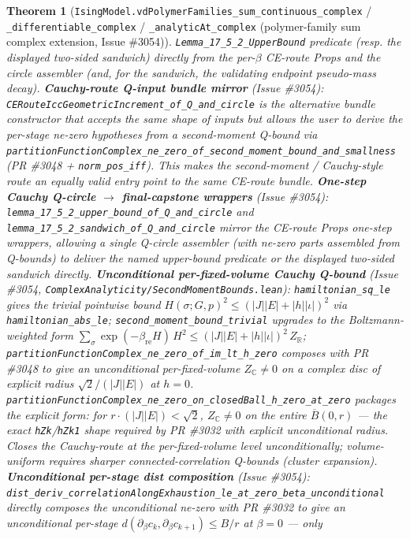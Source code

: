 \documentclass[a4paper,11pt]{article}
\newtheorem{theorem}{Theorem}
\begin{document}
\begin{theorem}[\texttt{IsingModel.vdPolymerFamilies\_sum\_continuous\_complex} /
\texttt{\_differentiable\_complex} / \texttt{\_analyticAt\_complex} (polymer-family sum
complex extension, Issue \#3054)]
\texttt{Lemma\_17\_5\_2\_UpperBound} predicate (resp. the displayed two-sided
sandwich) directly from the per-\(\beta\) CE-route Props and the circle
assembler (and, for the sandwich, the validating endpoint pseudo-mass decay).
\textbf{Cauchy-route Q-input bundle mirror} (Issue \#3054):
\texttt{CERouteIccGeometricIncrement\_of\_Q\_and\_circle} is the alternative
bundle constructor that accepts the same shape of inputs but allows the user
to derive the per-stage ne-zero hypotheses from a second-moment Q-bound via
\texttt{partitionFunctionComplex\_ne\_zero\_of\_second\_moment\_bound\_and\_smallness}
(PR \#3048 + \texttt{norm\_pos\_iff}). This makes the second-moment /
Cauchy-style route an equally valid entry point to the same CE-route bundle.
\textbf{One-step Cauchy Q-circle \(\to\) final-capstone wrappers} (Issue \#3054):
\texttt{lemma\_17\_5\_2\_upper\_bound\_of\_Q\_and\_circle} and
\texttt{lemma\_17\_5\_2\_sandwich\_of\_Q\_and\_circle} mirror the CE-route Props
one-step wrappers, allowing a single Q-circle assembler (with ne-zero parts
assembled from Q-bounds) to deliver the named upper-bound predicate or the
displayed two-sided sandwich directly.
\textbf{Unconditional per-fixed-volume Cauchy Q-bound} (Issue \#3054,
\texttt{ComplexAnalyticity/SecondMomentBounds.lean}):
\texttt{hamiltonian\_sq\_le} gives the trivial pointwise bound
\(H(\sigma;G,p)^2\le(|J||E|+|h||\iota|)^2\) via \texttt{hamiltonian\_abs\_le};
\texttt{second\_moment\_bound\_trivial} upgrades to the Boltzmann-weighted form
\(\sum_\sigma\exp(-\beta_{\mathrm{re}}H)\,H^2\le(|J||E|+|h||\iota|)^2\,Z_{\mathbb{R}}\);
\texttt{partitionFunctionComplex\_ne\_zero\_of\_im\_lt\_h\_zero} composes with
PR \#3048 to give an unconditional per-fixed-volume \(Z_{\mathbb{C}}\ne0\) on a
complex disc of explicit radius \(\sqrt{2}/(|J||E|)\) at \(h=0\).
\texttt{partitionFunctionComplex\_ne\_zero\_on\_closedBall\_h\_zero\_at\_zero}
packages the explicit form: for
\(r\cdot(|J||E|)<\sqrt{2}\), \(Z_{\mathbb{C}}\ne0\) on the entire
\(\overline{B}(0,r)\) — the exact \texttt{hZk}/\texttt{hZk1} shape required by
PR \#3032 with explicit unconditional radius. Closes the Cauchy-route at the
per-fixed-volume level unconditionally; volume-uniform requires sharper
connected-correlation Q-bounds (cluster expansion).
\textbf{Unconditional per-stage dist composition} (Issue \#3054):
\texttt{dist\_deriv\_correlationAlongExhaustion\_le\_at\_zero\_beta\_unconditional}
directly composes the unconditional ne-zero with PR \#3032 to give an
unconditional per-stage
\(d(\partial_\beta c_k,\partial_\beta c_{k+1})\le B/r\) at \(\beta=0\) — only

\end{theorem}
\end{document}
